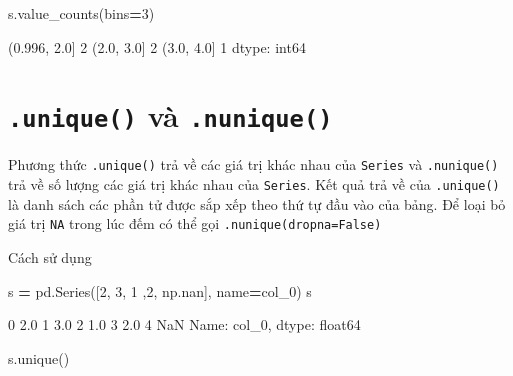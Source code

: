 \documentclass[
]{book}
\newenvironment{Shaded}{\begin{snugshade}}{\end{snugshade}}
\newcommand{\DecValTok}[1]{\textcolor[rgb]{0.00,0.00,0.81}{#1}}
\newcommand{\NormalTok}[1]{#1}
\newcommand{\OperatorTok}[1]{\textcolor[rgb]{0.81,0.36,0.00}{\textbf{#1}}}
\newcommand{\StringTok}[1]{\textcolor[rgb]{0.31,0.60,0.02}{#1}}
\begin{document}
\begin{Shaded}
\begin{Highlighting}[]
\NormalTok{s.value\_counts(bins}\OperatorTok{=}\DecValTok{3}\NormalTok{)}
\end{Highlighting}
\end{Shaded}

\begin{Shaded}
\begin{Highlighting}[]
\NormalTok{(0.996, 2.0]    2}
\NormalTok{(2.0, 3.0]      2}
\NormalTok{(3.0, 4.0]      1}
\NormalTok{dtype: int64}
\end{Highlighting}
\end{Shaded}

\section{\texorpdfstring{\texttt{.unique()} và \texttt{.nunique()}}{.unique() và .nunique()}}\label{unique-vuxe0-.nunique}

Phương thức \texttt{.unique()} trả về các giá trị khác nhau của \texttt{Series} và \texttt{.nunique()} trả về số lượng các giá trị khác nhau của \texttt{Series}. Kết quả trả về của \texttt{.unique()} là danh sách các phần tử được sắp xếp theo thứ tự đầu vào của bảng. Để loại bỏ giá trị \texttt{NA} trong lúc đếm có thể gọi \texttt{.nunique(dropna=False)}

Cách sử dụng

\begin{Shaded}
\begin{Highlighting}[]
\NormalTok{s }\OperatorTok{=}\NormalTok{ pd.Series([}\DecValTok{2}\NormalTok{, }\DecValTok{3}\NormalTok{, }\DecValTok{1}\NormalTok{ ,}\DecValTok{2}\NormalTok{, np.nan], name}\OperatorTok{=}\StringTok{\textquotesingle{}col\_0\textquotesingle{}}\NormalTok{)}
\NormalTok{s}
\end{Highlighting}
\end{Shaded}

\begin{Shaded}
\begin{Highlighting}[]
\NormalTok{0    2.0}
\NormalTok{1    3.0}
\NormalTok{2    1.0}
\NormalTok{3    2.0}
\NormalTok{4    NaN}
\NormalTok{Name: col\_0, dtype: float64}
\end{Highlighting}
\end{Shaded}

\begin{Shaded}
\begin{Highlighting}[]
\NormalTok{s.unique()}
\end{Highlighting}
\end{Shaded}
\end{document}
